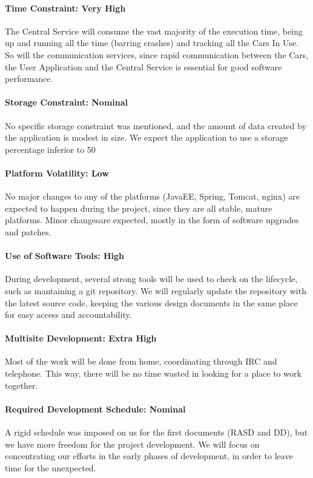 \paragraph*{Time Constraint: Very High}
The Central Service will consume the vast majority of the execution time, being up and running all the time (barring crashes) and tracking all the Cars In Use. So will the communication services, since rapid communication between the Cars, the User Application and the Central Service is essential for good software performance.

\paragraph*{Storage Constraint: Nominal}
No specific storage constraint was mentioned, and the amount of data created by the application is modest in size. We expect the application to use a storage percentage inferior to 50%

\paragraph*{Platform Volatility: Low}
No major changes to any of the platforms (JavaEE, Spring, Tomcat, nginx) are expected to happen during the project, since they are all stable, mature platforms. Minor changesare expected, mostly in the form of software upgrades and patches.

\paragraph*{Use of Software Tools: High}
During development, several strong tools will be used to check on the lifecycle, such as mantaining a git repository. We will regularly update the repository with the latest source code, keeping the various design documents in the same place for easy access and accountability.

\paragraph*{Multisite Development: Extra High}
Most of the work will be done from home, coordinating through IRC and telephone. This way, there will be no time wasted in looking for a place to work together.

\paragraph*{Required Development Schedule: Nominal}
A rigid schedule was imposed on us for the first documents (RASD and DD), but we have more freedom for the project development. We will focus on concentrating our efforts in the early phases of development, in order to leave time for the unexpected.

